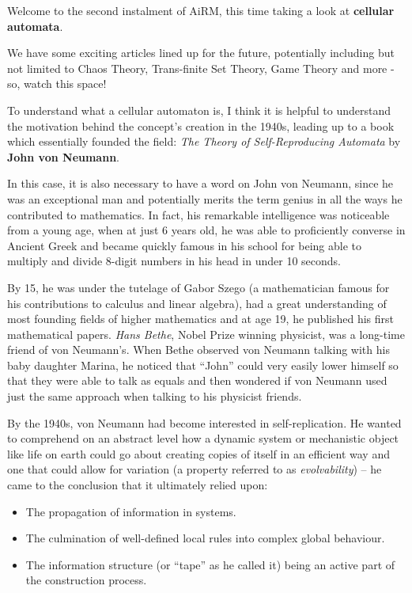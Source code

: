 \documentclass[10pt,a4paper]{article}
\begin{document}
\begin{multicols}{2}

Welcome to the second instalment of AiRM, this time taking a look at
\textbf{cellular automata}.

We have some exciting articles lined up for the future, potentially
including but not limited to Chaos Theory, Trans-finite Set Theory, Game
Theory and more - so, watch this space!

To understand what a cellular automaton is, I think it is helpful to
understand the motivation behind the concept's creation in the 1940s,
leading up to a book which essentially founded the field: \emph{The
	Theory of Self-Reproducing Automata} by \textbf{John von Neumann}.

In this case, it is also necessary to have a word on John von Neumann,
since he was an exceptional man and potentially merits the term genius
in all the ways he contributed to mathematics. In fact, his remarkable
intelligence was noticeable from a young age, when at just 6 years old,
he was able to proficiently converse in Ancient Greek and became quickly
famous in his school for being able to multiply and divide 8-digit
numbers in his head in under 10 seconds.

By 15, he was under the tutelage of Gabor Szego (a mathematician famous
for his contributions to calculus and linear algebra), had a great
understanding of most founding fields of higher mathematics and at age
19, he published his first mathematical papers. \emph{Hans Bethe}, Nobel
Prize winning physicist, was a long-time friend of von Neumann's. When
Bethe observed von Neumann talking with his baby daughter Marina, he
noticed that ``John'' could very easily lower himself so that they were
able to talk as equals and then wondered if von Neumann used just the
same approach when talking to his physicist friends.

By the 1940s, von Neumann had become interested in self-replication. He
wanted to comprehend on an abstract level how a dynamic system or
mechanistic object like life on earth could go about creating copies of
itself in an efficient way and one that could allow for variation (a
property referred to as \emph{evolvability}) -- he came to the
conclusion that it ultimately relied upon:

\begin{itemize}
	\item
	The propagation of information in systems.
	\item
	The culmination of well-defined local rules into complex global
	behaviour.
	\item
	The information structure (or ``tape'' as he called it) being an
	active part of the construction process.
\end{itemize}


\end{multicols}
\end{document}
